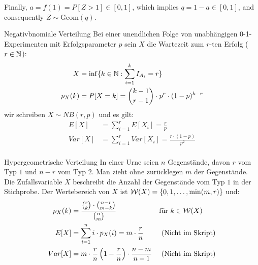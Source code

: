 Finally, $a = f(1) = P[Z > 1] \in [0, 1]$, which implies $q = 1 - a \in [0, 1]$, and consequently $Z \sim \text{Geom}(q)$.
\BoxEnd{}
\begin{definition}{Negativbnomiale Verteilung}
Bei einer unendlichen Folge von unabhängigen 0-1-Experimenten mit
Erfolgsparameter $p$ sein $X$ die Wartezeit zum $r$-ten Erfolg ($r \in \mathbb{N}$):
\begin{align*}
  X       & = \inf \{ k \in \mathbb{N} : \sum_{i = 1}^k I_{A_i} = r \}         \\
  p_X (k) & = P[X = k] = \binom{k-1}{r-1} \cdot p^r \cdot  (1-p)^{k-r}
\end{align*}
wir schreiben $X \sim NB (r, p)$ und es gilt:
\begin{align*}
  E[X]   & = \sum_{i = 1}^r E[X_i] = \frac{r}{p}                  \\
  Var[X] & = \sum_{i = 1}^r Var[X_i] = \frac{r \cdot  (1-p)}{p^2}\\
\end{align*}
\end{definition}
\begin{definition}{Hypergeometrische Verteilung}
In einer Urne seien $n$ Gegenstände, davon $r$ vom Typ $1$ und $n-r$ vom Typ
$2$. Man zieht ohne zurücklegen $m$ der Gegenstände. Die Zufallsvariable $X$
beschreibt die Anzahl der Gegenstände vom Typ $1$ in der Stichprobe. Der
Wertebereich von $X$ ist $\mathcal{W} (X) = \{0, 1, \dots, \min (m, r)\}$ und:
\begin{align*}
  p_X (k) & = \frac{\binom{r}{k} \cdot \binom{n-r}{m-k}}{\binom{n}{m}}
          &                                                                                 & \text{für } k \in \mathcal{W} (X)                             \\
  E[X]    & = \sum_{i = 1}^n i \cdot p_X (i) = m \cdot \frac{r}{n}                                     &                          & \text{ (Nicht im Skript)} \\
  Var[X]  & = m \cdot \frac{r}{n} \left(1 - \frac{r}{n} \right) \cdot \frac{n - m}{n - 1} &                          & \text{ (Nicht im Skript)}
\end{align*}
\end{definition}
